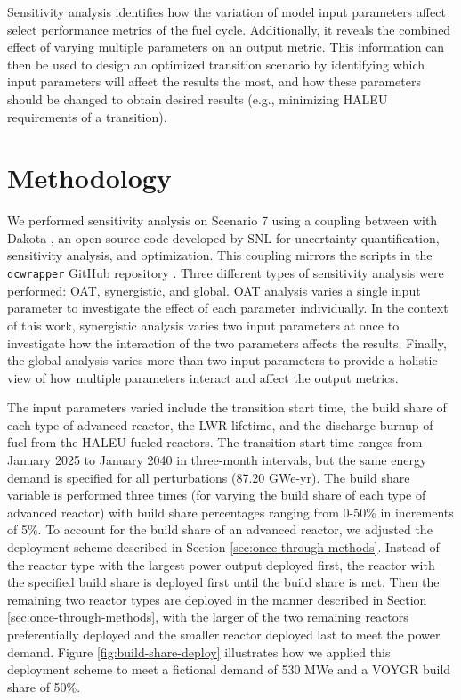 Sensitivity analysis identifies how the variation of model input
parameters affect select performance 
metrics of the fuel cycle. Additionally, it reveals the combined effect 
of varying multiple parameters on 
an output metric. This information can then be used to design 
an optimized transition scenario by identifying which input parameters 
will affect the results the most, and how these parameters should be 
changed to obtain desired results (e.g., minimizing \gls{HALEU} requirements
of a transition). 

\section{Methodology}
We performed sensitivity analysis on Scenario 7 using a coupling 
between \Cyclus with Dakota \cite{adams_dakota_2021}, an 
open-source code developed by \gls{SNL} for uncertainty quantification, 
sensitivity analysis, and optimization. This coupling mirrors  
the scripts in the \texttt{dcwrapper} GitHub repository 
\cite{chee_arfcdcwrapper_2019}. Three different types 
of sensitivity analysis were performed: \acrfull{OAT}, synergistic, 
and global. \gls{OAT} analysis varies a single input parameter to 
investigate the effect of each parameter individually. In the context of 
this work, synergistic 
analysis varies two input parameters at once to investigate how the 
interaction of the two parameters affects the results. Finally, the global 
analysis varies more than two input parameters to provide a holistic 
view of how multiple parameters interact and affect the output metrics. 

The input parameters varied include the transition 
start time, the build share of each type of advanced reactor, 
the \gls{LWR} lifetime, and the discharge burnup of fuel from the 
\gls{HALEU}-fueled reactors. The transition start time ranges from January 
2025 to January 2040 in three-month intervals, but the same energy demand 
is specified for all perturbations (87.20 GWe-yr). The build share 
variable is performed three times (for varying the build share of each 
type of advanced reactor) with build share percentages ranging from 0-50\% 
in increments of 5\%. To account for the build share of an advanced reactor,
we adjusted the deployment scheme described in Section \ref{sec:once-through-methods}.
Instead of the reactor type with the largest power output 
deployed first, the reactor with the specified build share is deployed first 
until the build share is met. Then the remaining two reactor types are 
deployed in the manner described in Section \ref{sec:once-through-methods},
with the larger of the two remaining reactors preferentially deployed and 
the smaller reactor deployed last to meet the power demand. Figure 
\ref{fig:build-share-deploy} illustrates how we applied this deployment 
scheme to meet a fictional demand of 530 MWe and a VOYGR build share of 
50\%. 

